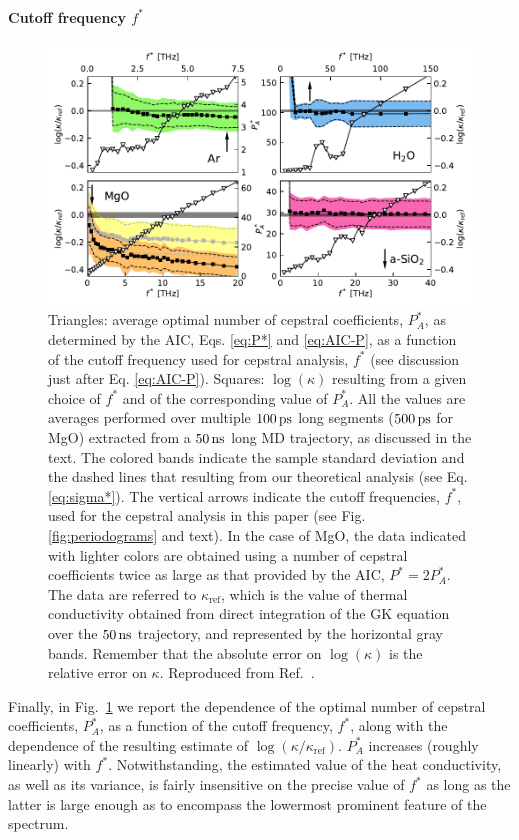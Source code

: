 \paragraph{Cutoff frequency $f^*$}
\begin{figure}[!tb]
    \centering
    \includegraphics[width=\textwidth]{chapters/chapter5/figures/kappa_vs_fstar.pdf}
    \caption{Triangles: average optimal number of cepstral coefficients, $P_A^*$, as determined by the AIC, Eqs. \eqref{eq:P*} and \eqref{eq:AIC-P}, as a function of the cutoff frequency used for cepstral analysis, $f^*$ (see discussion just after Eq. \eqref{eq:AIC-P}). Squares: $\log(\kappa)$ resulting from a given choice of $f^*$ and of the corresponding value of $P_A^*$. All the values are averages performed over multiple $100\,\mathrm{ps}$ long segments ($500\,\mathrm{ps}$ for MgO) extracted from a $50\,\mathrm{ns}$ long MD trajectory, as discussed in the text. The colored bands indicate the sample standard deviation and the dashed lines that resulting from our theoretical analysis (see Eq. \eqref{eq:sigma*}). The vertical arrows indicate the cutoff frequencies, $f^*$, used for the cepstral analysis in this paper (see Fig. \ref{fig:periodograms} and text). In the case of MgO, the data indicated with lighter colors are obtained using a number of cepstral coefficients twice as large as that provided by the AIC, $P^*=2P_A^*$. The data are referred to $\kappa_{\mathrm{ref}}$, which is the value of thermal conductivity obtained from direct integration of the GK equation over the $50\,\mathrm{ns}$ trajectory, and represented by the horizontal gray bands. Remember that the absolute error on $\log(\kappa)$ is the relative error on $\kappa$. Reproduced from Ref.~\cite{Ercole2017}.
    }
    \label{fig:kappa_vs_fstar}
\end{figure}
Finally, in Fig.~\ref{fig:kappa_vs_fstar} we report the dependence of the optimal number of cepstral coefficients, $P_A^*$, as a function of the cutoff frequency, $f^*$, along with the dependence of the resulting estimate of $\log(\kappa/\kappa_{\mathrm{ref}})$. $P_A^*$ increases (roughly linearly) with $f^*$. Notwithstanding, the estimated value of the heat conductivity, as well as its variance, is fairly insensitive on the precise value of $f^*$ as long as the latter is large enough as to encompass the lowermost prominent feature of the spectrum. 
